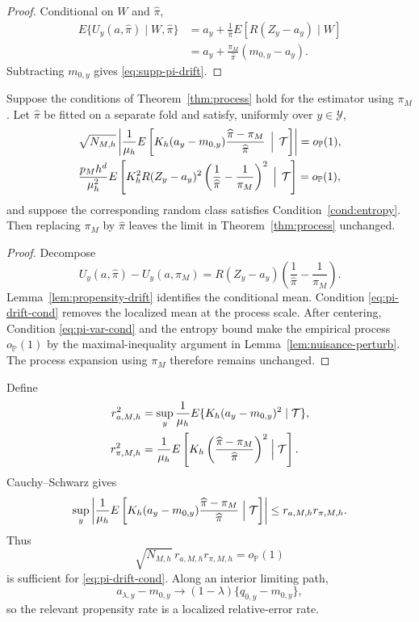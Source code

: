 \begin{proof}
Conditional on \(W\) and \(\widehat\pi\),
\[
\begin{aligned}
E\{U_y(a,\widehat\pi)\mid W,\widehat\pi\}
&=a_y+\frac1{\widehat\pi}E[R(Z_y-a_y)\mid W]\\
&=a_y+\frac{\pi_M}{\widehat\pi}(m_{0,y}-a_y).
\end{aligned}
\]
Subtracting \(m_{0,y}\) gives \eqref{eq:supp-pi-drift}.
\end{proof}

\begin{proposition}
\label{prop:pi-extension}
Suppose the conditions of Theorem~\ref{thm:process} hold for the estimator using \(\pi_M\). Let \(\widehat\pi\) be fitted on a separate fold and satisfy, uniformly over \(y\in\mathcal Y\),
\begin{align}
&\sqrt{N_{M,h}}
\left|
\frac1{\mu_h}
E\left[
K_h(a_y-m_{0,y})
\frac{\widehat\pi-\pi_M}{\widehat\pi}
\,\Bigm|\,\mathcal T
\right]
\right|
=o_{\mathbb P}(1),
\label{eq:pi-drift-cond}\\
&\frac{p_Mh^d}{\mu_h^2}
E\left[
K_h^2R(Z_y-a_y)^2
\left(\frac1{\widehat\pi}-\frac1{\pi_M}\right)^2
\,\Bigm|\,\mathcal T
\right]
=o_{\mathbb P}(1),
\label{eq:pi-var-cond}
\end{align}
and suppose the corresponding random class satisfies Condition~\ref{cond:entropy}. Then replacing \(\pi_M\) by \(\widehat\pi\) leaves the limit in Theorem~\ref{thm:process} unchanged.
\end{proposition}

\begin{proof}
Decompose
\[
U_y(a,\widehat\pi)-U_y(a,\pi_M)
=
R(Z_y-a_y)
\left(\frac1{\widehat\pi}-\frac1{\pi_M}\right).
\]
Lemma~\ref{lem:propensity-drift} identifies the conditional mean. Condition \eqref{eq:pi-drift-cond} removes the localized mean at the process scale. After centering, Condition \eqref{eq:pi-var-cond} and the entropy bound make the empirical process \(o_{\mathbb P}(1)\) by the maximal-inequality argument in Lemma~\ref{lem:nuisance-perturb}. The process expansion using \(\pi_M\) therefore remains unchanged.
\end{proof}

Define
\begin{align*}
r_{a,M,h}^2
&=
\sup_y
\frac1{\mu_h}
E\{K_h(a_y-m_{0,y})^2\mid\mathcal T\},\\
r_{\pi,M,h}^2
&=
\frac1{\mu_h}
E\left[
K_h
\left(\frac{\widehat\pi-\pi_M}{\widehat\pi}\right)^2
\Bigm|\mathcal T
\right].
\end{align*}
Cauchy--Schwarz gives
\[
\sup_y
\left|
\frac1{\mu_h}
E\left[
K_h(a_y-m_{0,y})
\frac{\widehat\pi-\pi_M}{\widehat\pi}
\Bigm|\mathcal T
\right]
\right|
\le r_{a,M,h}r_{\pi,M,h}.
\]
Thus
\[
\sqrt{N_{M,h}}\,r_{a,M,h}r_{\pi,M,h}
=o_{\mathbb P}(1)
\]
is sufficient for \eqref{eq:pi-drift-cond}. Along an interior limiting path,
\[
a_{\lambda,y}-m_{0,y}
\to
(1-\lambda)\{q_{0,y}-m_{0,y}\},
\]
so the relevant propensity rate is a localized relative-error rate.

